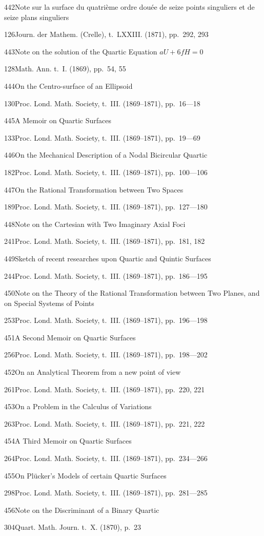 \documentclass[11pt,a4paper]{book}
\providecommand{\tocentry}[2]{#1\dotfill #2\par}
\begin{document}
\tocentry{442}{Note sur la surface du quatri\`{e}me ordre dou\'{e}e de seize points singuliers et de seize plans singuliers}{126}{Journ. der Mathem. (Crelle), t.~LXXIII. (1871), pp.~292, 293}

\tocentry{443}{Note on the solution of the Quartic Equation $aU + 6fH = 0$}{128}{Math. Ann. t.~I. (1869), pp.~54, 55}

\tocentry{444}{On the Centro-surface of an Ellipsoid}{130}{Proc. Lond. Math. Society, t.~III. (1869--1871), pp.~16---18}

\tocentry{445}{A Memoir on Quartic Surfaces}{133}{Proc. Lond. Math. Society, t.~III. (1869--1871), pp.~19---69}

\newpage

\tocentry{446}{On the Mechanical Description of a Nodal Bicircular Quartic}{182}{Proc. Lond. Math. Society, t.~III. (1869--1871), pp.~100---106}

\tocentry{447}{On the Rational Transformation between Two Spaces}{189}{Proc. Lond. Math. Society, t.~III. (1869--1871), pp.~127---180}

\tocentry{448}{Note on the Cartesian with Two Imaginary Axial Foci}{241}{Proc. Lond. Math. Society, t.~III. (1869--1871), pp.~181, 182}

\tocentry{449}{Sketch of recent researches upon Quartic and Quintic Surfaces}{244}{Proc. Lond. Math. Society, t.~III. (1869--1871), pp.~186---195}

\tocentry{450}{Note on the Theory of the Rational Transformation between Two Planes, and on Special Systems of Points}{253}{Proc. Lond. Math. Society, t.~III. (1869--1871), pp.~196---198}

\tocentry{451}{A Second Memoir on Quartic Surfaces}{256}{Proc. Lond. Math. Society, t.~III. (1869--1871), pp.~198---202}

\tocentry{452}{On an Analytical Theorem from a new point of view}{261}{Proc. Lond. Math. Society, t.~III. (1869--1871), pp.~220, 221}

\tocentry{453}{On a Problem in the Calculus of Variations}{263}{Proc. Lond. Math. Society, t.~III. (1869--1871), pp.~221, 222}

\tocentry{454}{A Third Memoir on Quartic Surfaces}{264}{Proc. Lond. Math. Society, t.~III. (1869--1871), pp.~234---266}

\tocentry{455}{On Pl\"{u}cker's Models of certain Quartic Surfaces}{298}{Proc. Lond. Math. Society, t.~III. (1869--1871), pp.~281---285}

\tocentry{456}{Note on the Discriminant of a Binary Quartic}{304}{Quart. Math. Journ. t.~X. (1870), p.~23}
\end{document}
